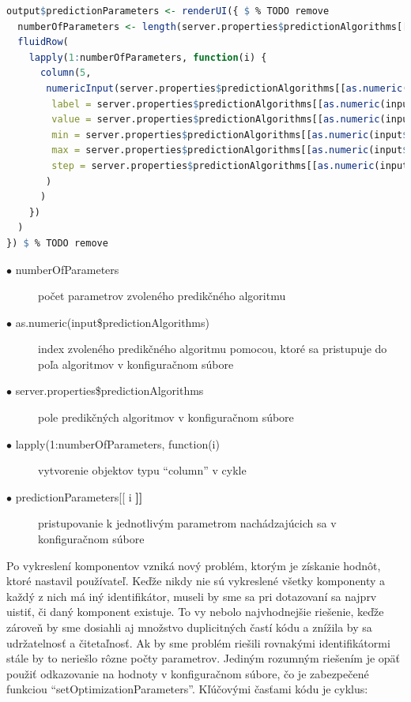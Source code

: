 \documentclass[a4paper,slovak,12pt,appendix]{article}
\begin{document}
\begin{lstlisting}[language=R]
output$predictionParameters <- renderUI({ $ % TODO remove
  numberOfParameters <- length(server.properties$predictionAlgorithms[[as.numeric(input$predictionAlgorithms)]]$predictionParameters)
  fluidRow(
    lapply(1:numberOfParameters, function(i) {
      column(5,
       numericInput(server.properties$predictionAlgorithms[[as.numeric(input$predictionAlgorithms)]]$predictionParameters[[i]]$id,
        label = server.properties$predictionAlgorithms[[as.numeric(input$predictionAlgorithms)]]$predictionParameters[[i]]$label,
        value = server.properties$predictionAlgorithms[[as.numeric(input$predictionAlgorithms)]]$predictionParameters[[i]]$value,
        min = server.properties$predictionAlgorithms[[as.numeric(input$predictionAlgorithms)]]$predictionParameters[[i]]$min,
        max = server.properties$predictionAlgorithms[[as.numeric(input$predictionAlgorithms)]]$predictionParameters[[i]]$max,
        step = server.properties$predictionAlgorithms[[as.numeric(input$predictionAlgorithms)]]$predictionParameters[[i]]$step
       )
      )
    })
  )
}) $ % TODO remove
\end{lstlisting}

\begin{description}
  \item[$\bullet$ numberOfParameters] počet parametrov zvoleného predikčného algoritmu
  \item[$\bullet$ as.numeric(input\$predictionAlgorithms)] index zvoleného predikčného algoritmu pomocou, ktoré sa pristupuje do poľa algoritmov v konfiguračnom súbore
  \item[$\bullet$ server.properties\$predictionAlgorithms] pole predikčných algoritmov v konfiguračnom súbore
  \item[$\bullet$ lapply(1:numberOfParameters, function(i)] vytvorenie objektov typu ``column'' v cykle
  \item[$\bullet$ predictionParameters[[ i \textbf{]]} ] pristupovanie k jednotlivým parametrom nachádzajúcich sa v konfiguračnom súbore
\end{description}

Po vykreslení komponentov vzniká nový problém, ktorým je získanie hodnôt, ktoré
nastavil používateľ. Keďže nikdy nie sú vykreslené všetky komponenty a každý
z nich má iný identifikátor, museli by sme sa pri dotazovaní sa najprv uistiť,
či daný komponent existuje. To vy nebolo najvhodnejšie riešenie, keďže zároveň
by sme dosiahli aj množstvo duplicitných častí kódu a znížila by sa udržatelnosť
a čitetaľnosť. Ak by sme problém riešili rovnakými identifikátormi stále by to
neriešlo rôzne počty parametrov. Jediným rozumným riešením je opäť použiť
odkazovanie na hodnoty v konfiguračnom súbore, čo je zabezpečené funkciou
``setOptimizationParameters''. Kľúčovými časťami kódu je cyklus:
\end{document}
